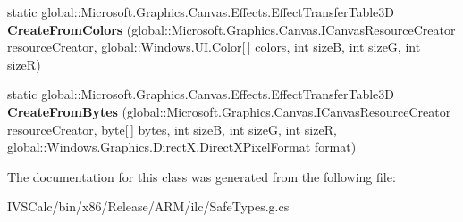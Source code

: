 \begin{DoxyCompactItemize}
static global\+::\+Microsoft.\+Graphics.\+Canvas.\+Effects.\+Effect\+Transfer\+Table3D {\bfseries Create\+From\+Colors} (global\+::\+Microsoft.\+Graphics.\+Canvas.\+I\+Canvas\+Resource\+Creator resource\+Creator, global\+::\+Windows.\+U\+I.\+Color\mbox{[}$\,$\mbox{]} colors, int sizeB, int sizeG, int sizeR)
\item 
\mbox{\label{class_microsoft_1_1_graphics_1_1_canvas_1_1_effects_1_1_effect_transfer_table3_d_a710783796df3cf65dfda645371d857cb}} 
static global\+::\+Microsoft.\+Graphics.\+Canvas.\+Effects.\+Effect\+Transfer\+Table3D {\bfseries Create\+From\+Bytes} (global\+::\+Microsoft.\+Graphics.\+Canvas.\+I\+Canvas\+Resource\+Creator resource\+Creator, byte\mbox{[}$\,$\mbox{]} bytes, int sizeB, int sizeG, int sizeR, global\+::\+Windows.\+Graphics.\+Direct\+X.\+Direct\+X\+Pixel\+Format format)
\end{DoxyCompactItemize}


The documentation for this class was generated from the following file\+:\begin{DoxyCompactItemize}
\item 
I\+V\+S\+Calc/bin/x86/\+Release/\+A\+R\+M/ilc/Safe\+Types.\+g.\+cs\end{DoxyCompactItemize}
